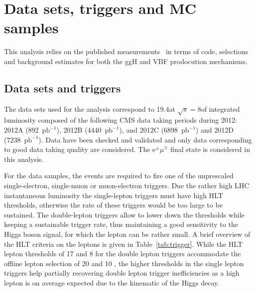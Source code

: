 \section{Data sets, triggers and MC samples}
\label{sec:Datasets}

This analysis relies on the published \hww measurements~\cite{Chatrchyan:2013iaa} in terms of code, selections and background estimates for both the ggH and VBF prodocution mechanisms.

\subsection{Data sets and triggers\label{subsec:Datasets}}

The data sets used for the analysis correspond to 19.4\ifb at $\sqrt{s}=8$\TeV  of integrated luminosity composed of the following CMS data taking periods during 2012: 2012A (892~$\mathrm{pb}^{-1}$), 2012B (4440~$\mathrm{pb}^{-1}$), and 2012C (6898~$\mathrm{pb}^{-1}$) and 2012D (7238~$\mathrm{pb}^{-1}$).
Data have been checked and validated and only data corresponding to good data taking quality are considered.
The $\mathrm{e}^{\pm}\mu^{\mp}$ final state is considered in this analysis.

For the data samples, the events are required to fire one of the unprescaled
single-electron, single-muon or muon-electron triggers. Due the rather high LHC instantaneous luminosity the single-lepton triggers must have high HLT \pt thresholds, otherwise the rate of these triggers would be too large to be sustained. The double-lepton triggers allow to lower down the \pt thresholds while keeping a sustainable trigger rate, thus maintaining a good sensitivity to the Higgs boson signal, for which the lepton \pt can be rather small.
A brief overview of the HLT \pt criteria on the leptons
is given in Table~\ref{tab:trigger}. While the HLT lepton \pt thresholds of 17 and 8 \GeV for the double
lepton triggers accommodate the offline lepton \pt selection of 20 and 10 \GeV, the higher \pt thresholds
in the single lepton triggers help partially recovering double lepton trigger inefficiencies
as a high \pt lepton is on average expected due to the kinematic of the Higgs decay. 

